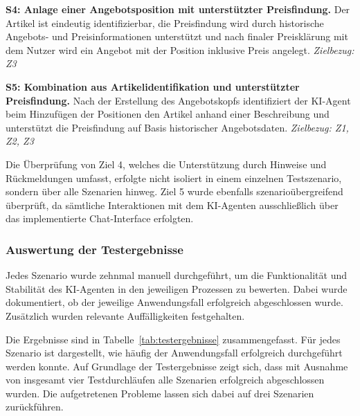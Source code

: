 \textbf{S4: Anlage einer Angebotsposition mit unterstützter Preisfindung.}  \newline 
    Der Artikel ist eindeutig identifizierbar, die Preisfindung wird durch historische Angebots- und Preisinformationen unterstützt und nach finaler Preisklärung mit dem Nutzer wird ein Angebot mit der Position inklusive Preis angelegt.\newline 
\textit{Zielbezug: Z3}

\textbf{S5: Kombination aus Artikelidentifikation und unterstützter Preisfindung.}  \newline 
    Nach der Erstellung des Angebotskopfs identifiziert der \ac{KI}-Agent beim Hinzufügen der Positionen den Artikel anhand einer Beschreibung und unterstützt die Preisfindung auf Basis historischer Angebotsdaten.\newline 
\textit{Zielbezug: Z1, Z2, Z3}

Die Überprüfung von Ziel 4, welches die Unterstützung durch Hinweise und Rückmeldungen umfasst, erfolgte nicht isoliert in einem einzelnen Testszenario, sondern über alle Szenarien hinweg. Ziel 5 wurde ebenfalls szenarioübergreifend überprüft, da sämtliche Interaktionen mit dem \ac{KI}-Agenten ausschließlich über das implementierte Chat-Interface erfolgten.

\subsubsection{Auswertung der Testergebnisse}

Jedes Szenario wurde zehnmal manuell durchgeführt, um die Funktionalität und Stabilität des \ac{KI}-Agenten in den jeweiligen Prozessen zu bewerten. Dabei wurde dokumentiert, ob der jeweilige Anwendungsfall erfolgreich abgeschlossen wurde. Zusätzlich wurden relevante Auffälligkeiten festgehalten.

Die Ergebnisse sind in Tabelle~\ref{tab:testergebnisse} zusammengefasst. Für jedes Szenario ist dargestellt, wie häufig der Anwendungsfall erfolgreich durchgeführt werden konnte. Auf Grundlage der Testergebnisse zeigt sich, dass mit Ausnahme von insgesamt vier Testdurchläufen alle Szenarien erfolgreich abgeschlossen wurden. Die aufgetretenen Probleme lassen sich dabei auf drei Szenarien zurückführen.

